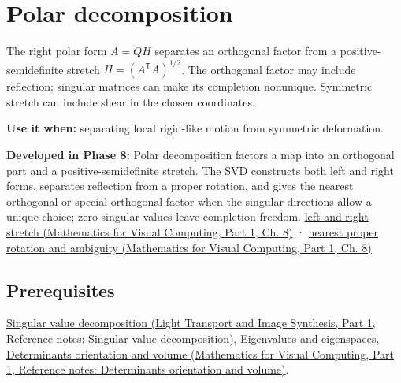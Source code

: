 \hypertarget{appendix-73f5bcf7a462}{}\label{referencestart:appendix-73f5bcf7a462}
\section{Polar decomposition}\label{appendix-73f5bcf7a462-polar-decomposition}

\hypertarget{appendix-73f5bcf7a462-polar-decomposition}{}

The right polar form \(A=QH\) separates an orthogonal factor from a positive-semidefinite stretch \(H=(A^\mathsf T A)^{1/2}\). The orthogonal factor may include reflection; singular matrices can make its completion nonunique. Symmetric stretch can include shear in the chosen coordinates.

\textbf{Use it when:} separating local rigid-like motion from symmetric deformation.

\textbf{Developed in Phase 8:} Polar decomposition factors a map into an orthogonal part and a positive-semidefinite stretch. The SVD constructs both left and right forms, separates reflection from a proper rotation, and gives the nearest orthogonal or special-orthogonal factor when the singular directions allow a unique choice; zero singular values leave completion freedom. \href{../02-Mathematics-for-Visual-Computing-P01/main.pdf\#02-foundations-ii-ch024-polar-decomposition-separates-frame-dependent-stretch-from-orientation}{left and right stretch (Mathematics for Visual Computing, Part 1, Ch. 8)} · \href{../02-Mathematics-for-Visual-Computing-P01/main.pdf\#02-foundations-ii-ch024-two-sided-rotations-nearest-proper-rotation-and-nonunique-directions}{nearest proper rotation and ambiguity (Mathematics for Visual Computing, Part 1, Ch. 8)}

\subsection{Prerequisites}\label{appendix-73f5bcf7a462-prerequisites}

\hypertarget{appendix-73f5bcf7a462-prerequisites}{}

\href{../04-Light-Transport-and-Image-Synthesis-P01/main.pdf\#appendix-1fad5e7f36fa}{Singular value decomposition (Light Transport and Image Synthesis, Part 1, Reference notes: Singular value decomposition)}, \hyperref[appendix-0b3be18411f9]{Eigenvalues and eigenspaces}, \href{../02-Mathematics-for-Visual-Computing-P01/main.pdf\#appendix-da478be01d02}{Determinants orientation and volume (Mathematics for Visual Computing, Part 1, Reference notes: Determinants orientation and volume)}.

